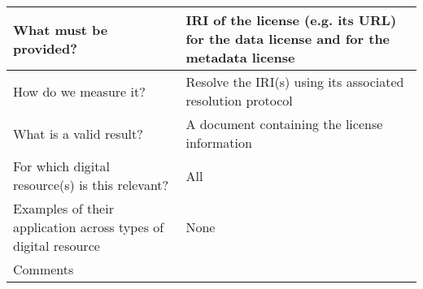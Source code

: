 \documentclass[english]{article}
\begin{document}
\begin{longtable}{|p{5cm}|p{9cm}|}
  
\\



\hline
What must be provided? &  


IRI of the license (e.g. its URL) for the data license and for the metadata license

\\



\hline
How do we measure it? &  

Resolve the IRI(s) using its associated resolution protocol



\\



\hline
What is a valid result? &  


A document containing the license information

\\



\hline
For which digital resource(s) is this relevant? &  All\\



\hline
Examples of their application across types of digital resource &  None

\\



\hline

Comments & 


\\
\hline

\end{longtable}
\end{document}
